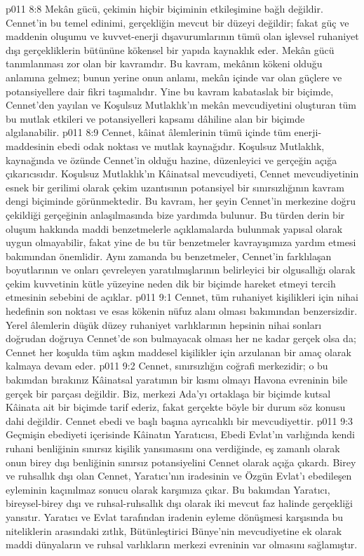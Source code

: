 \vs p011 8:8 Mekân gücü, çekimin hiçbir biçiminin etkileşimine bağlı değildir. Cennet’in bu temel edinimi, gerçekliğin mevcut bir düzeyi değildir; fakat güç ve maddenin oluşumu ve kuvvet\hyp{}enerji dışavurumlarının tümü olan işlevsel ruhaniyet dışı gerçekliklerin bütününe kökensel bir yapıda kaynaklık eder. Mekân gücü tanımlanması zor olan bir kavramdır. Bu kavram, mekânın kökeni olduğu anlamına gelmez; bunun yerine onun anlamı, mekân içinde var olan güçlere ve potansiyellere dair fikri taşımalıdır. Yine bu kavram kabataslak bir biçimde, Cennet’den yayılan ve Koşulsuz Mutlaklık’ın mekân mevcudiyetini oluşturan tüm bu mutlak etkileri ve potansiyelleri kapsamı dâhiline alan bir biçimde algılanabilir.
\vs p011 8:9 Cennet, kâinat âlemlerinin tümü içinde tüm enerji\hyp{}maddesinin ebedi odak noktası ve mutlak kaynağıdır. Koşulsuz Mutlaklık, kaynağında ve özünde Cennet’in olduğu hazine, düzenleyici ve gerçeğin açığa çıkarıcısıdır. Koşulsuz Mutlaklık’ın Kâinatsal mevcudiyeti, Cennet mevcudiyetinin esnek bir gerilimi olarak çekim uzantısının potansiyel bir sınırsızlığının kavram dengi biçiminde görünmektedir. Bu kavram, her şeyin Cennet’in merkezine doğru çekildiği gerçeğinin anlaşılmasında bize yardımda bulunur. Bu türden derin bir oluşum hakkında maddi benzetmelerle açıklamalarda bulunmak yapısal olarak uygun olmayabilir, fakat yine de bu tür benzetmeler kavrayışımıza yardım etmesi bakımından önemlidir. Aynı zamanda bu benzetmeler, Cennet’in farklılaşan boyutlarının ve onları çevreleyen yaratılmışlarının belirleyici bir olgusallığı olarak çekim kuvvetinin kütle yüzeyine neden dik bir biçimde hareket etmeyi tercih etmesinin sebebini de açıklar.
\vs p011 9:1 Cennet, tüm ruhaniyet kişilikleri için nihai hedefinin son noktası ve esas kökenin nüfuz alanı olması bakımından benzersizdir. Yerel âlemlerin düşük düzey ruhaniyet varlıklarının hepsinin nihai sonları doğrudan doğruya Cennet’de son bulmayacak olması her ne kadar gerçek olsa da; Cennet her koşulda tüm aşkın maddesel kişilikler için arzulanan bir amaç olarak kalmaya devam eder.
\vs p011 9:2 Cennet, sınırsızlığın coğrafi merkezidir; o bu bakımdan bırakınız Kâinatsal yaratımın bir kısmı olmayı Havona evreninin bile gerçek bir parçası değildir. Biz, merkezi Ada’yı ortaklaşa bir biçimde kutsal Kâinata ait bir biçimde tarif ederiz, fakat gerçekte böyle bir durum söz konusu dahi değildir. Cennet ebedi ve başlı başına ayrıcalıklı bir mevcudiyettir.
\vs p011 9:3 Geçmişin ebediyeti içerisinde Kâinatın Yaratıcısı, Ebedi Evlat’ın varlığında kendi ruhani benliğinin sınırsız kişilik yansımasını ona verdiğinde, eş zamanlı olarak onun birey dışı benliğinin sınırsız potansiyelini Cennet olarak açığa çıkardı. Birey ve ruhsallık dışı olan Cennet, Yaratıcı’nın iradesinin ve Özgün Evlat’ı ebedileşen eyleminin kaçınılmaz sonucu olarak karşımıza çıkar. Bu bakımdan Yaratıcı, bireysel\hyp{}birey dışı ve ruhsal\hyp{}ruhsallık dışı olarak iki mevcut faz halinde gerçekliği yansıtır. Yaratıcı ve Evlat tarafından iradenin eyleme dönüşmesi karşısında bu niteliklerin arasındaki zıtlık, Bütünleştirici Bünye’nin mevcudiyetine ek olarak maddi dünyaların ve ruhsal varlıkların merkezi evreninin var olmasını sağlamıştır.
